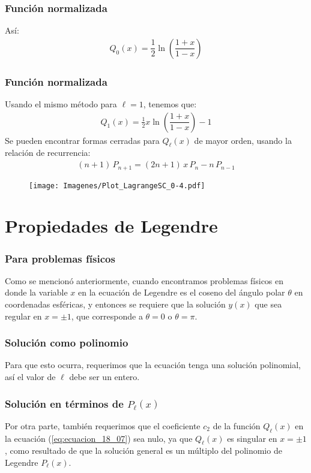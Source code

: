 \documentclass[12pt]{beamer}
\begin{document}
\begin{frame}
\frametitle{Función normalizada}
Así:
\pause
\begin{align*}
Q_{0} (x) = \dfrac{1}{2} \ln \left( \dfrac{1 + x}{1 - x} \right)
\end{align*}
\end{frame}
\begin{frame}
\frametitle{Función normalizada}
Usando el mismo método para $\ell = 1$, tenemos que:
\pause
\begin{align*}
Q_{1} (x) =  \frac{1}{2} x \ln \left( \dfrac{1 + x}{1 - x} \right) - 1
\end{align*}
\pause
Se pueden encontrar formas cerradas para $Q_{\ell} (x)$ de mayor orden, usando la relación de recurrencia:
\pause
\begin{align*}
(n + 1) \, P_{n+1} = (2 n + 1) \, x \, P_{n} - n \, P_{n-1}
\end{align*}
\end{frame}
\begin{frame}[plain]
\begin{figure}
    \centering
    \texttt{[image: Imagenes/Plot\_LagrangeSC\_0-4.pdf]}
\end{figure}
\end{frame}
  
\section{Propiedades de Legendre}

\begin{frame}
\frametitle{Para problemas físicos}
Como se mencionó anteriormente, cuando encontramos problemas físicos en donde la variable $x$ en la ecuación de Legendre es el coseno del ángulo polar $\theta$ en coordenadas esféricas, \pause y entonces se requiere que la solución $y (x)$ que sea regular en $x = \pm 1$, que corresponde a $\theta = 0$ o $\theta = \pi$. 
\end{frame}
\begin{frame}
\frametitle{Solución como polinomio}
Para que esto ocurra, requerimos que la ecuación tenga una solución polinomial, así el valor de $\ell$ debe ser un entero.
\end{frame}
\begin{frame}
\frametitle{Solución en términos de $P_{\ell} (x)$}
Por otra parte, también requerimos que el coeficiente $c_{2}$ de la función $Q_{\ell}(x)$ en la ecuación (\ref{eq:ecuacion_18_07}) sea nulo, ya que $Q_{\ell}(x)$ es singular en $x = \pm 1$, \pause como resultado de que la solución general es un múltiplo del polinomio de Legendre $P_{\ell} (x)$.
\end{frame}
\end{document}
